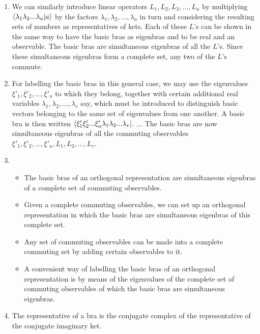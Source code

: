 \begin{enumerate}
	\item We can similarly introduce linear operators $L_1,L_2,L_3,...,L_u$ by multiplying $\langle \lambda_1\lambda_2...\lambda_u | a \rangle$ by the factors $\lambda_1, \lambda_2,...,\lambda_u$ in turn and considering the resulting sets of numbers as representatives of kets. Each of these $L$'s can be shown in the same way to have the basic bras as eigenbras and to be real and an observable. The basic bras are simultaneous eigenbras of all the $L$'s. Since these simultaneous eigenbras form a complete set, any two of the $L$'s commute.

	\item For labelling the basic bras in this general case, we may use the eigenvalues $\xi'_1,\xi'_2,...,\xi'_u$ to which they belong, together with certain additional real variables $\lambda_1,\lambda_2,...,\lambda_v$ say, which must be introduced to distinguish basic vectors belonging to the same set of eigenvalues from one another. A basic bra is then written $\langle \xi'_1\xi'_2...\xi'_u\lambda_1\lambda_2...\lambda_v |$. ... The basic bras are now simultaneous eigenbras of all the commuting observables $\xi'_1,\xi'_2,...,\xi'_u,L_1,L_2,...,L_v$.

	\item
	\begin{itemize}
		\item The basic bras of an orthogonal representation are simultaneous eigenbras of a complete set of commuting observables.

		\item Given a complete commuting observables, we can set up an orthogonal representation in which the basic bras are simultaneous eigenbras of this complete set.

		\item Any set of commuting observables can be made into a complete commuting set by adding certain observables to it.

		\item A convenient way of labelling the basic bras of an orthogonal representation is by means of the eigenvalues of the complete set of commuting observables of which the basic bras are simultaneous eigenbras.
	\end{itemize}

	\item The representative of a bra is the conjugate complex of the representative of the conjugate imaginary ket.


\end{enumerate}
